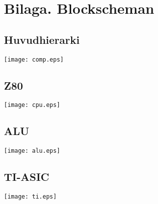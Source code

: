 \documentclass[main.tex]{subfiles}
\begin{document}
\newpage
\recalctypearea
\vspace*{-10mm}
\section{Bilaga. Blockscheman}
\subsection{Huvudhierarki}
\label{diag:comp}
\begin{minipage}{\textwidth}
    \texttt{[image: comp.eps]}
\end{minipage}
\vspace*{-10mm}
\subsection{Z80}
\label{diag:z80}
\begin{minipage}{\textwidth}
    \vspace{-2mm}
    \hspace{-15mm}
    \texttt{[image: cpu.eps]}
\end{minipage}
\vspace*{-10mm}
\subsection{ALU}
\label{diag:alu}
\begin{minipage}{\textwidth}
    \texttt{[image: alu.eps]}
\end{minipage}
\vspace*{-10mm}
\subsection{TI-ASIC}
\label{diag:ti}
\begin{minipage}{\textwidth}
    \texttt{[image: ti.eps]}
\end{minipage}
\newpage
\recalctypearea
\end{document}

